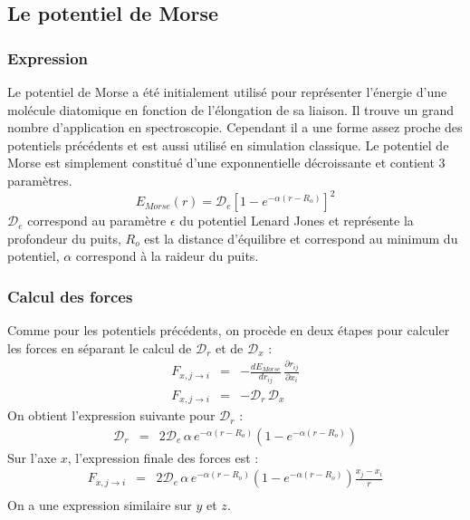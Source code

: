 \documentclass[11pt,a4paper,fleqn]{book}
\begin{document}
\subsection{Le potentiel de Morse}

\subsubsection{Expression}

Le potentiel de Morse a été initialement utilisé pour représenter l'énergie
d'une molécule diatomique en fonction de l'élongation de sa liaison. Il trouve
un grand nombre d'application en spectroscopie. Cependant il a une forme
assez proche des potentiels précédents et est aussi utilisé en simulation
classique. Le potentiel de Morse est simplement constitué d'une exponnentielle
décroissante et contient 3 paramètres.
%
\begin{equation}\label{eq_pot_morse}
	E_{Morse}(r) = \mathcal{D}_e\left[ 1 - e^{-\alpha(r-R_o) }\right]^2
\end{equation}
%
$\mathcal{D}_e$ correspond au paramètre $\epsilon$ du potentiel Lenard Jones
et représente la profondeur du puits, $R_o$ est la distance d'équilibre
et correspond au minimum du potentiel, $\alpha$ correspond à la raideur
du puits. 

\subsubsection{Calcul des forces}

Comme pour les potentiels précédents, on procède en deux étapes pour 
calculer les forces en séparant le calcul de $\mathcal{D}_r$ et de
$\mathcal{D}_x$ :
%
\begin{eqnarray*}
	F_{x,j\rightarrow i} & = & -\frac{d E_{Morse}}{d r_{ij}}\,\frac{\partial r_{ij}}{\partial x_i} \\
	F_{x,j\rightarrow i} & = & -\mathcal{D}_r \, \mathcal{D}_x \nonumber
\end{eqnarray*}
%
On obtient l'expression suivante pour $\mathcal{D}_r$ :
%
\begin{eqnarray}
	\mathcal{D}_r & = & 2 \mathcal{D}_e \, \alpha \, e^{-\alpha(r-R_o)}\left( 1 - e^{-\alpha(r-R_o) }\right)
\end{eqnarray}
%
Sur l'axe $x$, l'expression finale des forces est : 
%
\begin{eqnarray*}
	F_{x,j\rightarrow i} & = & 2\mathcal{D}_e \, \alpha \, e^{-\alpha(r-R_o)}
		\left( 1 - e^{-\alpha(r-R_o) }\right)\frac{x_j-x_i}{r}\\
\end{eqnarray*}
%
On a une expression similaire sur $y$ et $z$.
\end{document}
